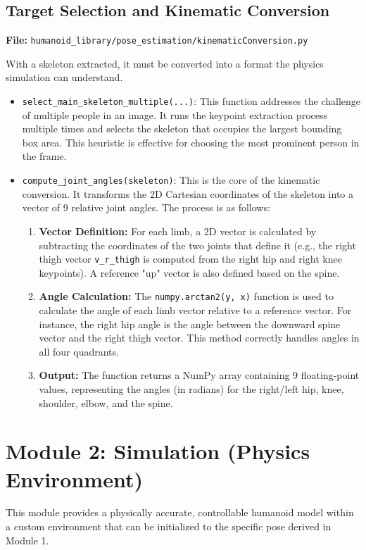 \documentclass{article}
\begin{document}
\subsection{Target Selection and Kinematic Conversion}
\textbf{File:} \texttt{humanoid_library/pose_estimation/kinematicConversion.py}

With a skeleton extracted, it must be converted into a format the physics simulation can understand.

\begin{itemize}
    \item \texttt{select_main_skeleton_multiple(...)}: This function addresses the challenge of multiple people in an image. It runs the keypoint extraction process multiple times and selects the skeleton that occupies the largest bounding box area. This heuristic is effective for choosing the most prominent person in the frame.
    
    \item \texttt{compute_joint_angles(skeleton)}: This is the core of the kinematic conversion. It transforms the 2D Cartesian coordinates of the skeleton into a vector of 9 relative joint angles. The process is as follows:
    \begin{enumerate}
        \item \textbf{Vector Definition:} For each limb, a 2D vector is calculated by subtracting the coordinates of the two joints that define it (e.g., the right thigh vector \texttt{v_r_thigh} is computed from the right hip and right knee keypoints). A reference "up" vector is also defined based on the spine.
        \item \textbf{Angle Calculation:} The \texttt{numpy.arctan2(y, x)} function is used to calculate the angle of each limb vector relative to a reference vector. For instance, the right hip angle is the angle between the downward spine vector and the right thigh vector. This method correctly handles angles in all four quadrants.
        \item \textbf{Output:} The function returns a NumPy array containing 9 floating-point values, representing the angles (in radians) for the right/left hip, knee, shoulder, elbow, and the spine.
    \end{enumerate}
\end{itemize}

\section{Module 2: Simulation (Physics Environment)}
This module provides a physically accurate, controllable humanoid model within a custom environment that can be initialized to the specific pose derived in Module 1.
\end{document}
